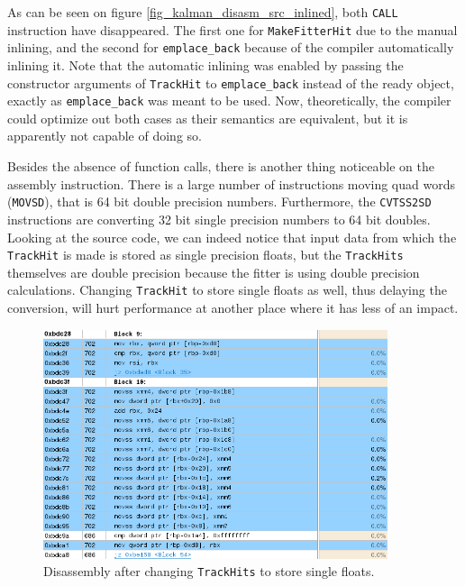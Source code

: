 \documentclass[12pt]{article}
\newcommand{\code}[1]{\texttt{#1}}
\begin{document}
As can be seen on figure \ref{fig_kalman_disasm_src_inlined}, both \code{CALL} instruction have disappeared. The first one for \code{MakeFitterHit} due to the manual inlining, and the second for \code{emplace\_back} because of the compiler automatically inlining it. Note that the automatic inlining was enabled by passing the constructor arguments of \code{TrackHit} to \code{emplace\_back} instead of the ready object, exactly as \code{emplace\_back} was meant to be used. Now, theoretically, the compiler could optimize out both cases as their semantics are equivalent, but it is apparently not capable of doing so.

Besides the absence of function calls, there is another thing noticeable on the assembly instruction. There is a large number of instructions moving quad words (\code{MOVSD}), that is 64 bit double precision numbers. Furthermore, the \code{CVTSS2SD} instructions are converting 32 bit single precision numbers to 64 bit doubles. Looking at the source code, we can indeed notice that input data from which the \code{TrackHit} is made is stored as single precision floats, but the \code{TrackHits} themselves are double precision because the fitter is using double precision calculations. Changing \code{TrackHit} to store single floats as well, thus delaying the conversion, will hurt performance at another place where it has less of an impact.

\begin{figure}[H]
	\begin{center}
		\includegraphics[width=0.9\textwidth]{kalmanfit_disasm_opt_asm_nocvt}
	\end{center}
	\caption{Disassembly after changing \code{TrackHits} to store single floats.}
	\label{fig_kalman_disasm_src_nocvt}
\end{figure}
\end{document}
